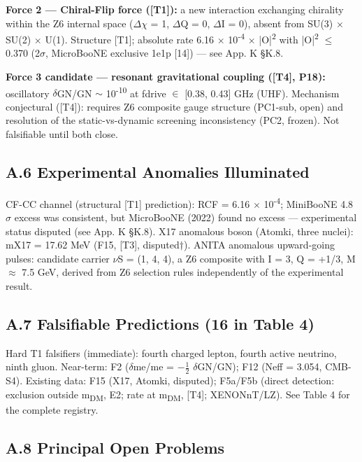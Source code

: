 \documentclass[11pt,letterpaper]{article}
\begin{document}
\noindent \textbf{Force 2 --- Chiral-Flip force ([T1]): }a new interaction exchanging chirality within the Z6 internal space ($\Delta$$\chi$ = 1, $\Delta$Q = 0, $\Delta$I = 0), absent from SU(3) $\times$ SU(2) $\times$ U(1). Structure [T1]; absolute rate 6.16 $\times$ 10\textsuperscript{-4} $\times$ |O|\textsuperscript{2} with |O|\textsuperscript{2} $\le$ 0.370 (2$\sigma$, MicroBooNE exclusive 1e1p [14]) --- see App. K §K.8.

\noindent \textbf{Force 3 candidate --- resonant gravitational coupling ([T4], P18): }oscillatory $\delta$GN/GN $\sim$ 10\textsuperscript{-10} at fdrive $\in$ [0.38, 0.43] GHz (UHF). Mechanism conjectural ([T4]): requires Z6 composite gauge structure (PC1-sub, open) and resolution of the static-vs-dynamic screening inconsistency (PC2, frozen). Not falsifiable until both close.

\subsection*{A.6  Experimental Anomalies Illuminated}

\noindent CF-CC channel (structural [T1] prediction): RCF = 6.16 $\times$ 10\textsuperscript{-4}; MiniBooNE 4.8$\sigma$ excess was consistent, but MicroBooNE (2022) found no excess --- experimental status disputed (see App. K §K.8). X17 anomalous boson (Atomki, three nuclei): mX17 = 17.62 MeV (F15, [T3], disputed$\dagger$). ANITA anomalous upward-going pulses: candidate carrier $\nu$S = (1, 4, 4), a Z6 composite with I = 3, Q = +1/3, M $\approx$ 7.5 GeV, derived from Z6 selection rules independently of the experimental result.

\subsection*{A.7  Falsifiable Predictions (16 in Table 4)}

\noindent Hard T1 falsifiers (immediate): fourth charged lepton, fourth active neutrino, ninth gluon. Near-term: F2 ($\delta$me/me = $-$$\tfrac{1}{2}$ $\delta$GN/GN); F12 (Neff = 3.054, CMB-S4). Existing data: F15 (X17, Atomki, disputed); F5a/F5b (direct detection: exclusion outside m\textsubscript{DM}, E2; rate at m\textsubscript{DM}, [T4]; XENONnT/LZ). See Table 4 for the complete registry.

\subsection*{A.8  Principal Open Problems}
\end{document}
